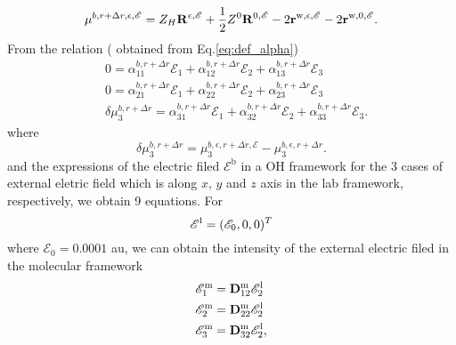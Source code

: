 \begin{equation}
  \mu^{b,r+\Delta r,\epsilon,\mathscr{E}} = Z_H{\bf R}^{\epsilon,\mathscr{E}} + 
  \frac{1}{2}Z^0 {\bf R}^{0,\mathscr{E}} -2 {\bf r}^{\text{w},\epsilon,\mathscr{E}} -2{\bf r}^{\text{w},0,\mathscr{E}}.
\end{equation}
From the relation ( obtained from Eq.\space\ref{eq:def_alpha})
      \begin{subequations}
          \begin{align}
            & 0 = \alpha^{b,r+\Delta r}_{11}\mathscr{E}_{1} + \alpha^{b,r+\Delta r}_{12}\mathscr{E}_{2} + \alpha^{b,r+\Delta r}_{13}\mathscr{E}_{3}\\
            & 0 = \alpha^{b,r+\Delta r}_{21}\mathscr{E}_{1} + \alpha^{b,r+\Delta r}_{22}\mathscr{E}_{2} + \alpha^{b,r+\Delta r}_{23}\mathscr{E}_{3}\\
            & \delta \mu^{b,r+\Delta r}_{3} = \alpha^{b,r+\Delta r}_{31}\mathscr{E}_{1} + \alpha^{b,r+\Delta r}_{32}\mathscr{E}_{2} + \alpha^{b,r+\Delta r}_{33}\mathscr{E}_{3}.
          \end{align}
      \end{subequations}
%
where
\begin{equation}
  \delta \mu^{b,r+\Delta r}_{3} = \mu^{b,\epsilon,r+\Delta r,\mathscr{E}}_{3} - \mu^{b,\epsilon,r+\Delta r}_{3}.
\end{equation}
%
and the expressions of the electric filed ${\mathscr{E}^\text{b}}$ in a OH framework for the 3 cases of external eletric field 
which is along $x$, $y$ and $z$ axis in the lab framework, respectively, we obtain 9 equations.
%
For
\begin{equation}
  {\bf\mathscr{E}}^{\text{l}} = (\mathscr{E}_0, 0,0)^T \nonumber
\end{equation}  
where $\mathscr{E}_0 = 0.0001$ au, we can obtain the intensity of the external electric filed in the molecular framework  
\begin{subequations}
  \begin{align}
    &\mathscr{E}^\text{m}_1 = {\bf D}^{\text{m}}_{12} \mathscr{E}^\text{l}_2\\
    &\mathscr{E}^\text{m}_2 = {\bf D}^{\text{m}}_{22} \mathscr{E}^\text{l}_2\\
    &\mathscr{E}^\text{m}_3 = {\bf D}^{\text{m}}_{32} \mathscr{E}^\text{l}_2,
    \end{align}
\end{subequations}
